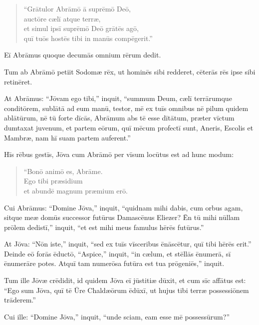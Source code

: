 \begin{verse}
\begin{patverse*}
``Grātulor Abrāmō ā suprēmō Deō, \\
auctōre cælī atque terræ,\\
\Versus et simul ipsī suprēmō Deō grātēs agō, \\
quī tuōs hostēs tibi in manūs compēgerit.''
\end{patverse*}
\end{verse}
Eī Abrāmus quoque decumās omnium rērum dedit.

\Versus Tum ab Abrāmō petiit Sodomæ rēx, ut hominēs sibi redderet, cēterās rēs ipse sibi retinēret.

\Versus At Abrāmus: ``Jōvam ego tibi,'' inquit, ``summum Deum, cælī terrārumque conditōrem, sublātā ad eum manū, testor,
\Versus mē ex tuīs omnibus nē pilum quidem ablātūrum, nē tū forte dīcās, Abrāmum abs tē esse dītātum,
\Versus præter vīctum dumtaxat juvenum, et partem eōrum, quī mēcum profectī sunt, Aneris, Escolis et Mambræ, nam hī suam partem auferent.''



\Caput
\Versus Hīs rēbus gestīs, Jōva cum Abrāmō per vīsum locūtus est ad hunc modum:

\begin{verse}
\begin{patverse*}
``Bonō animō es, Abrāme. \\
Ego tibi præsidium \\
et abundē magnum præmium erō.
\end{patverse*}
\end{verse}

\Versus Cui Abrāmus: ``Domine Jōva,'' inquit, ``quidnam mihi dabis, cum orbus agam, sitque meæ domūs successor futūrus Damascēnus Eliezer?
\Versus Ēn tū mihi nūllam prōlem dedistī,'' inquit, ``et est mihi meus famulus hērēs futūrus.''

\Versus At Jōva: ``Nōn iste,'' inquit, ``sed ex tuīs vīsceribus ēnāscētur, quī tibi hērēs erit.''
\Versus Deinde eō forās ēductō, ``Aspice,'' inquit, ``in cælum, et stēllās ēnumerā, sī ēnumerāre potes. Atquī tam numerōsa futūra est tua prōgeniēs,'' inquit.

\Versus Tum ille Jōvæ crēdidit, id quidem Jōva eī jūstitiæ dūxit,
\Versus et cum sīc affātus est: ``Ego sum Jōva, quī tē Ūre Chaldæōrum ēdūxī, ut hujus tibi terræ possessiōnem trāderem.''

\Versus Cui ille: ``Domine Jōva,'' inquit, ``unde sciam, eam esse mē possessūrum?''

